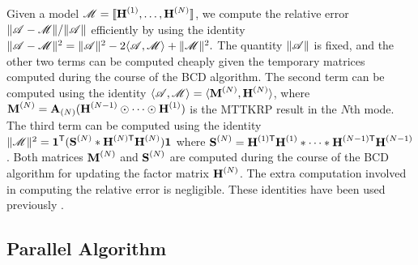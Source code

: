 Given a model $\T{M}=\CP$, we compute the relative error $\|\TA - \T{M}\|/\|\TA\|$ efficiently by using the identity $\|\TA-\T{M}\|^2 = \|\TA\|^2 - 2\langle \TA, \T{M} \rangle + \|\T{M}\|^2.$
The quantity $\|\TA\|$ is fixed, and the other two terms can be computed cheaply given the temporary matrices computed during the course of the BCD algorithm.
The second term can be computed using the identity $\langle \TA, \T{M} \rangle = \langle \Mn{M}{N}, \Mn{H}{N} \rangle$, where $\Mn{M}{N} = \Mz{A}{N} (\Mn{H}{N-1} \Khat \cdots \Khat \Mn{H}{1})$ is the MTTKRP result in the $N$th mode.
The third term can be computed using the identity $\|\T{M}\|^2 = \V{1}^\Tra(\Mn{S}{N} \Hada \MnTra{H}{N} \Mn{H}{N})\V{1}$ where $\Mn{S}{N}=\MnTra{H}{1} \Mn{H}{1} \Hada \cdots \Hada \MnTra{H}{N-1} \Mn{H}{N-1}$.
Both matrices $\Mn{M}{N}$ and $\Mn{S}{N}$ are computed during the course of the BCD algorithm for updating the factor matrix $\Mn{H}{N}$.
The extra computation involved in computing the relative error is negligible.
These identities have been used previously \cite{KB09,TensorBox,SK16,LKLHS2017}.

\subsection{Parallel Algorithm}

